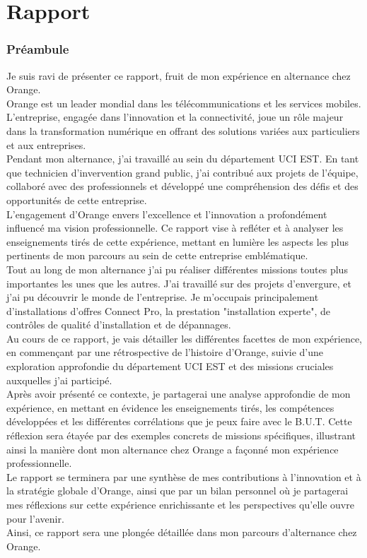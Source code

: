 \documentclass[12pt, a4paper]{article}
\begin{document}
\part{\Large{Rapport}}
\newpage
\pagestyle{fancy}
\section{Préambule}
Je suis ravi de présenter ce rapport, fruit de mon expérience en alternance chez Orange.\\

Orange est un leader mondial dans les télécommunications et les services mobiles.
L'entreprise, engagée dans l'innovation et la connectivité, joue un rôle majeur dans la
transformation numérique en offrant des solutions variées aux particuliers et aux entreprises.\\

Pendant mon alternance, j'ai travaillé au sein du département \gls{UCI} EST.
En tant que technicien d'invervention grand public, j'ai contribué aux projets de l'équipe, collaboré avec des
professionnels et développé une compréhension des défis et des opportunités
de cette entreprise.\\


L'engagement d'Orange envers l'excellence et l'innovation a profondément influencé ma vision
professionnelle. Ce rapport vise à refléter et à analyser les enseignements tirés de cette
expérience, mettant en lumière les aspects les plus pertinents de mon parcours au sein de
cette entreprise emblématique.\\

Tout au long de mon alternance j'ai pu réaliser différentes missions
toutes plus importantes les unes que les autres. J'ai travaillé sur des projets
d'envergure, et j'ai pu découvrir le monde de l'entreprise.
Je m'occupais principalement d'installations d'offres
Connect Pro, la prestation "installation experte", 
de contrôles de qualité d'installation et de dépannages.\\


Au cours de ce rapport, je vais détailler les différentes facettes de mon expérience,
en commençant par une rétrospective de l'histoire d'Orange, suivie d'une exploration
approfondie du département UCI EST et des missions cruciales auxquelles
j'ai participé.\\
Après avoir présenté ce contexte, je partagerai une analyse approfondie
de mon expérience, en mettant en évidence les enseignements tirés,
les compétences développées et les différentes corrélations 
que je peux faire avec le B.U.T. Cette réflexion sera étayée par des exemples
concrets de missions spécifiques, illustrant ainsi la manière dont mon
alternance chez Orange a façonné mon expérience professionnelle.\\
Le rapport se terminera par une synthèse de mes contributions à
l'innovation et à la stratégie globale d'Orange, ainsi que par un
bilan personnel où je partagerai mes réflexions sur cette expérience
enrichissante et les perspectives qu'elle ouvre pour l'avenir.\\
Ainsi, ce rapport sera une plongée détaillée dans mon parcours
d'alternance chez Orange.
\end{document}
